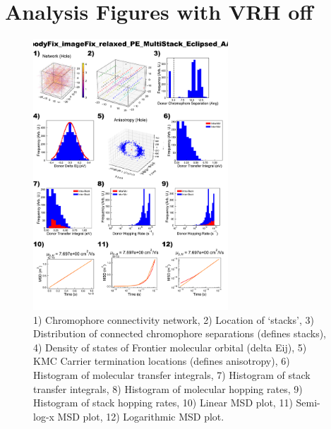 \documentclass[12pt]{article}
\begin{document}
\clearpage

\section{Analysis Figures with VRH off}

\begin{figure}[h]\centering
	\includegraphics[width=0.65\textwidth]{Figures/bodyFix_imageFix_relaxed_PE_MultiStack_Eclipsed_AA.png}
    \caption{   1) Chromophore connectivity network, 
                2) Location of `stacks', 
                3) Distribution of connected chromophore separations (defines stacks),
                4) Density of states of Frontier molecular orbital (delta Eij),
                5) KMC Carrier termination locations (defines anisotropy),
                6) Histogram of molecular transfer integrals,
                7) Histogram of stack transfer integrals,
                8) Histogram of molecular hopping rates,
                9) Histogram of stack hopping rates,
                10) Linear MSD plot,
                11) Semi-log-x MSD plot,
                12) Logarithmic MSD plot.}
	\label{fig:PEMultEcl}
\end{figure}
\end{document}
